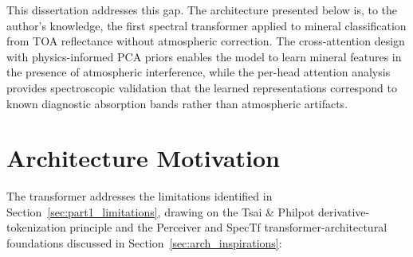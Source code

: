 \documentclass[11pt]{report}
\begin{document}
This dissertation addresses this gap. The architecture presented below is, to the author's knowledge, the first spectral transformer applied to mineral classification from TOA reflectance without atmospheric correction. The cross-attention design with physics-informed PCA priors enables the model to learn mineral features in the presence of atmospheric interference, while the per-head attention analysis provides spectroscopic validation that the learned representations correspond to known diagnostic absorption bands rather than atmospheric artifacts.

\section{Architecture Motivation}

The transformer addresses the limitations identified in Section~\ref{sec:part1_limitations}, drawing on the Tsai \& Philpot \cite{tsai1998derivative} derivative-tokenization principle and the Perceiver \cite{jaegle2021perceiver} and SpecTf \cite{lee2025spectf} transformer-architectural foundations discussed in Section~\ref{sec:arch_inspirations}:
\end{document}
